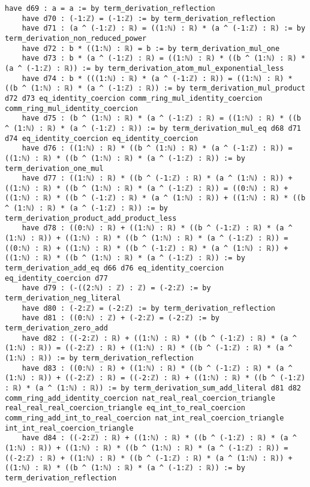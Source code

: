 \documentclass{article}
\begin{document}
\begin{tcolorbox}[colback=white!10, width=\linewidth]
\begin{lstlisting}[language=Lean4]
    have d69 : a = a := by term_derivation_reflection
    have d70 : (-1:ℤ) = (-1:ℤ) := by term_derivation_reflection
    have d71 : (a ^ (-1:ℤ) : ℝ) = ((1:ℕ) : ℝ) * (a ^ (-1:ℤ) : ℝ) := by term_derivation_non_reduced_power
    have d72 : b * ((1:ℕ) : ℝ) = b := by term_derivation_mul_one
    have d73 : b * (a ^ (-1:ℤ) : ℝ) = ((1:ℕ) : ℝ) * ((b ^ (1:ℕ) : ℝ) * (a ^ (-1:ℤ) : ℝ)) := by term_derivation_atom_mul_exponential_less
    have d74 : b * (((1:ℕ) : ℝ) * (a ^ (-1:ℤ) : ℝ)) = ((1:ℕ) : ℝ) * ((b ^ (1:ℕ) : ℝ) * (a ^ (-1:ℤ) : ℝ)) := by term_derivation_mul_product d72 d73 eq_identity_coercion comm_ring_mul_identity_coercion comm_ring_mul_identity_coercion
    have d75 : (b ^ (1:ℕ) : ℝ) * (a ^ (-1:ℤ) : ℝ) = ((1:ℕ) : ℝ) * ((b ^ (1:ℕ) : ℝ) * (a ^ (-1:ℤ) : ℝ)) := by term_derivation_mul_eq d68 d71 d74 eq_identity_coercion eq_identity_coercion
    have d76 : ((1:ℕ) : ℝ) * ((b ^ (1:ℕ) : ℝ) * (a ^ (-1:ℤ) : ℝ)) = ((1:ℕ) : ℝ) * ((b ^ (1:ℕ) : ℝ) * (a ^ (-1:ℤ) : ℝ)) := by term_derivation_one_mul
    have d77 : ((1:ℕ) : ℝ) * ((b ^ (-1:ℤ) : ℝ) * (a ^ (1:ℕ) : ℝ)) + ((1:ℕ) : ℝ) * ((b ^ (1:ℕ) : ℝ) * (a ^ (-1:ℤ) : ℝ)) = ((0:ℕ) : ℝ) + ((1:ℕ) : ℝ) * ((b ^ (-1:ℤ) : ℝ) * (a ^ (1:ℕ) : ℝ)) + ((1:ℕ) : ℝ) * ((b ^ (1:ℕ) : ℝ) * (a ^ (-1:ℤ) : ℝ)) := by term_derivation_product_add_product_less
    have d78 : ((0:ℕ) : ℝ) + ((1:ℕ) : ℝ) * ((b ^ (-1:ℤ) : ℝ) * (a ^ (1:ℕ) : ℝ)) + ((1:ℕ) : ℝ) * ((b ^ (1:ℕ) : ℝ) * (a ^ (-1:ℤ) : ℝ)) = ((0:ℕ) : ℝ) + ((1:ℕ) : ℝ) * ((b ^ (-1:ℤ) : ℝ) * (a ^ (1:ℕ) : ℝ)) + ((1:ℕ) : ℝ) * ((b ^ (1:ℕ) : ℝ) * (a ^ (-1:ℤ) : ℝ)) := by term_derivation_add_eq d66 d76 eq_identity_coercion eq_identity_coercion d77
    have d79 : (-((2:ℕ) : ℤ) : ℤ) = (-2:ℤ) := by term_derivation_neg_literal
    have d80 : (-2:ℤ) = (-2:ℤ) := by term_derivation_reflection
    have d81 : ((0:ℕ) : ℤ) + (-2:ℤ) = (-2:ℤ) := by term_derivation_zero_add
    have d82 : ((-2:ℤ) : ℝ) + ((1:ℕ) : ℝ) * ((b ^ (-1:ℤ) : ℝ) * (a ^ (1:ℕ) : ℝ)) = ((-2:ℤ) : ℝ) + ((1:ℕ) : ℝ) * ((b ^ (-1:ℤ) : ℝ) * (a ^ (1:ℕ) : ℝ)) := by term_derivation_reflection
    have d83 : ((0:ℕ) : ℝ) + ((1:ℕ) : ℝ) * ((b ^ (-1:ℤ) : ℝ) * (a ^ (1:ℕ) : ℝ)) + ((-2:ℤ) : ℝ) = ((-2:ℤ) : ℝ) + ((1:ℕ) : ℝ) * ((b ^ (-1:ℤ) : ℝ) * (a ^ (1:ℕ) : ℝ)) := by term_derivation_sum_add_literal d81 d82 comm_ring_add_identity_coercion nat_real_real_coercion_triangle real_real_real_coercion_triangle eq_int_to_real_coercion comm_ring_add_int_to_real_coercion nat_int_real_coercion_triangle int_int_real_coercion_triangle
    have d84 : ((-2:ℤ) : ℝ) + ((1:ℕ) : ℝ) * ((b ^ (-1:ℤ) : ℝ) * (a ^ (1:ℕ) : ℝ)) + ((1:ℕ) : ℝ) * ((b ^ (1:ℕ) : ℝ) * (a ^ (-1:ℤ) : ℝ)) = ((-2:ℤ) : ℝ) + ((1:ℕ) : ℝ) * ((b ^ (-1:ℤ) : ℝ) * (a ^ (1:ℕ) : ℝ)) + ((1:ℕ) : ℝ) * ((b ^ (1:ℕ) : ℝ) * (a ^ (-1:ℤ) : ℝ)) := by term_derivation_reflection

\end{lstlisting}
\end{tcolorbox}
\end{document}
